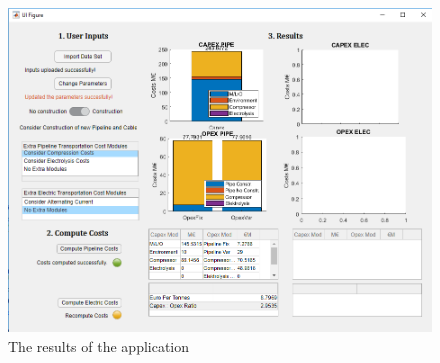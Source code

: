\documentclass{article}
\begin{document}
\begin{figure}[h!]
  \centering
  \includegraphics[width=.75\linewidth]{results.png}
  \caption{The results of the application}
  \label{fig:results}
\end{figure}
\end{document}
